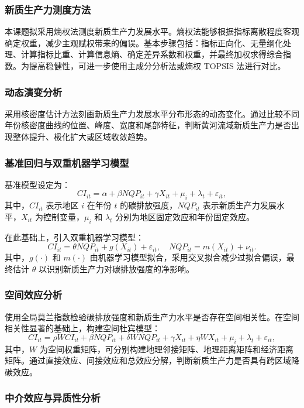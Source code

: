 \documentclass[UTF8,a4paper,zihao=-4,fontset=windows]{ctexart}
\newcommand{\regionscope}{黄河流域}
\begin{document}
\subsubsection{新质生产力测度方法}

本课题拟采用熵权法测度新质生产力发展水平。熵权法能够根据指标离散程度客观确定权重，减少主观赋权带来的偏误。基本步骤包括：指标正向化、无量纲化处理、计算指标比重、计算信息熵、确定差异系数和权重，并最终加权求得综合指数。为提高稳健性，可进一步使用主成分分析法或熵权 TOPSIS 法进行对比。

\subsubsection{动态演变分析}

采用核密度估计方法刻画新质生产力发展水平分布形态的动态变化。通过比较不同年份核密度曲线的位置、峰度、宽度和尾部特征，判断\regionscope 新质生产力是否出现整体提升、极化扩大或区域收敛趋势。

\subsubsection{基准回归与双重机器学习模型}

基准模型设定为：
\[
CI_{it}=\alpha+\beta NQP_{it}+\gamma X_{it}+\mu_i+\lambda_t+\varepsilon_{it},
\]
其中，$CI_{it}$ 表示地区 $i$ 在年份 $t$ 的碳排放强度，$NQP_{it}$ 表示新质生产力发展水平，$X_{it}$ 为控制变量，$\mu_i$ 和 $\lambda_t$ 分别为地区固定效应和年份固定效应。

在此基础上，引入双重机器学习模型：
\[
CI_{it}=\theta NQP_{it}+g(X_{it})+\varepsilon_{it},
\quad
NQP_{it}=m(X_{it})+\nu_{it}.
\]
其中，$g(\cdot)$ 和 $m(\cdot)$ 由机器学习模型拟合，采用交叉拟合减少过拟合偏误，最终估计 $\theta$ 以识别新质生产力对碳排放强度的净影响。

\subsubsection{空间效应分析}

使用全局莫兰指数检验碳排放强度和新质生产力水平是否存在空间相关性。在空间相关性显著的基础上，构建空间杜宾模型：
\[
CI_{it}=\rho WCI_{it}+\beta NQP_{it}+\delta WNQP_{it}+\gamma X_{it}+\eta WX_{it}+\mu_i+\lambda_t+\varepsilon_{it},
\]
其中，$W$ 为空间权重矩阵，可分别构建地理邻接矩阵、地理距离矩阵和经济距离矩阵。通过直接效应、间接效应和总效应分解，判断新质生产力是否具有跨区域降碳效应。

\subsubsection{中介效应与异质性分析}
\end{document}
